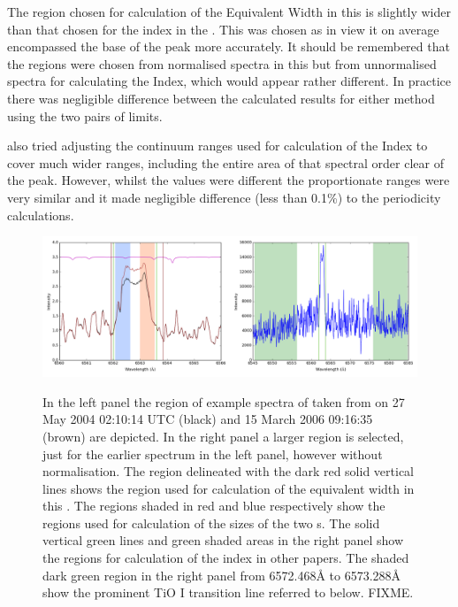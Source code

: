 The region chosen for calculation of the {\ha} Equivalent Width in this {\paperorthesis} is slightly wider than that
chosen for the {\ha} index in the \citet{suarezmascareno15}. This was chosen as in {\Firstposs} view it on average
encompassed the base of the {\ha} peak more accurately. It should be remembered that the regions were chosen from
normalised spectra in this {\paperorthesis} but from unnormalised spectra for calculating the {\ha} Index, which would
appear rather different. In practice there was negligible difference between the calculated results for either method
using the two pairs of limits.

{\FirstP} also tried adjusting the continuum ranges used for calculation of the {\ha} Index to cover much wider ranges,
including the entire area of that spectral order clear of the {\ha} peak. However, whilst the values were different the
proportionate ranges were very similar and it made negligible difference (less than 0.1\%) to the periodicity
calculations.

\begin{figure}[!htbp]
\begin{center}
\includegraphics[scale=0.25]{Figures/harpsfirstha4.png} \\
\end{center}   
\caption{In the left panel the {\ha} region of example spectra of {\prox} taken from {\harps} on 27 May 2004 02:10:14
  UTC (black) and 15 March 2006 09:16:35 (brown) are depicted. In the right panel a larger region is selected, just for
  the earlier spectrum in the left panel, however without normalisation. The region delineated with the dark red solid
  vertical lines shows the region used for calculation of the {\ha} equivalent width in this \paperorthesis. The regions
  shaded in red and blue respectively show the regions used for calculation of the sizes of the two \horn s. The solid
  vertical green lines and green shaded areas in the right panel show the regions for calculation of the {\ha} index in
  other papers. The shaded dark green region in the right panel from 6572.468{\AA} to 6573.288{\AA} show the prominent
  TiO I transition line referred to below. FIXME.
}
 \protect\label{fig:harpsfirstha}
\end{figure}

